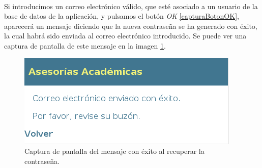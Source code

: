   \paragraph{}Si introducimos un correo electrónico válido, que esté asociado a
  un usuario de la base de datos de la aplicación, y pulsamos el botón
  \textit{OK} \ref{capturaBotonOK}, aparecerá un mensaje diciendo que la nueva
  contraseña se ha generado con éxito, la cual habrá sido enviada al correo
  electrónico introducido. Se puede ver una captura de pantalla de este mensaje
  en la imagen \ref{capturaPedirCorreoExito}.

  \begin{figure}[!ht]
    \begin{center}
      \includegraphics[]{4.Funcionamiento_Aplicacion/4.2.Acceso_Sistema/4.2.1.Recordar_Password/Capturas/pedir_correo_exito.png}
      \caption{Captura de pantalla del mensaje con éxito al recuperar la contraseña.}
      \label{capturaPedirCorreoExito}
    \end{center}
  \end{figure}